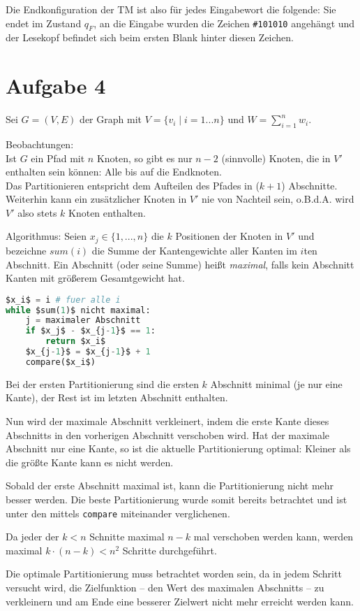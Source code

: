 \documentclass[a4paper]{article}
\begin{document}
Die Endkonfiguration der TM ist also für jedes Eingabewort die folgende:
Sie endet im Zustand $q_F$, an die Eingabe wurden die Zeichen
\texttt{\#101010} angehängt und der Lesekopf befindet sich beim ersten Blank
hinter diesen Zeichen.

\section{Aufgabe 4}

Sei $G = (V, E)$ der Graph mit $V = \{ v_i \mid i = 1 ... n \}$ und 
$W = \sum_{i = 1}^n w_i$.

Beobachtungen: \\
Ist $G$ ein Pfad mit $n$ Knoten, so gibt es nur $n-2$
(sinnvolle) Knoten, die in $V'$ enthalten sein können: Alle bis auf die
Endknoten. \\
Das Partitionieren entspricht dem Aufteilen des Pfades in ($k+1$) Abschnitte. \\
Weiterhin kann ein zusätzlicher Knoten in $V'$ nie von Nachteil
sein, o.B.d.A. wird $V'$ also stets $k$ Knoten enthalten.

Algorithmus:
Seien $x_j \in \{ 1, ..., n \}$ die $k$ Positionen der Knoten in $V'$ und
bezeichne $sum(i)$ die Summe der Kantengewichte aller Kanten im $i$ten
Abschnitt. Ein Abschnitt (oder seine Summe) heißt \emph{maximal}, falls kein
Abschnitt Kanten mit größerem Gesamtgewicht hat.

\begin{lstlisting}[language=Python]
$x_i$ = i # fuer alle i
while $sum(1)$ nicht maximal:
	j = maximaler Abschnitt
	if $x_j$ - $x_{j-1}$ == 1:
		return $x_i$
	$x_{j-1}$ = $x_{j-1}$ + 1
	compare($x_i$)
\end{lstlisting}

Bei der ersten Partitionierung sind die ersten $k$ Abschnitt minimal (je nur
eine Kante), der Rest ist im letzten Abschnitt enthalten.

Nun wird der maximale Abschnitt verkleinert, indem die erste Kante dieses
Abschnitts in den vorherigen Abschnitt verschoben wird.
Hat der maximale Abschnitt nur eine Kante, so ist die aktuelle
Partitionierung optimal: Kleiner als die größte Kante kann es nicht werden.

Sobald der erste Abschnitt maximal ist, kann die Partitionierung nicht mehr
besser werden. Die beste Partitionierung wurde somit bereits betrachtet und
ist unter den mittels \texttt{compare} miteinander verglichenen.

Da jeder der $k < n$ Schnitte maximal $n-k$ mal verschoben werden kann,
werden maximal $k \cdot (n-k) < n^2$ Schritte durchgeführt.

Die optimale Partitionierung muss betrachtet worden sein, da in jedem
Schritt versucht wird, die Zielfunktion -- den Wert des maximalen Abschnitts
-- zu verkleinern und am Ende eine besserer Zielwert nicht mehr erreicht
werden kann.
\end{document}
